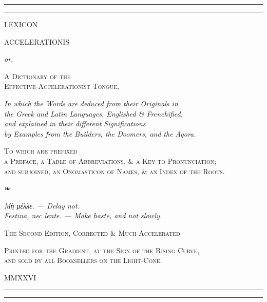 \documentclass[10pt,twoside]{article}
\begin{document}
\pagestyle{empty}

\begin{titlepage}
\centering
\vspace*{4mm}
{\color{rubric}\rule{\textwidth}{1.2pt}}\par\vspace{1.2pt}
\rule{\textwidth}{0.4pt}\par
\vspace{13mm}
{\dispfont\fontsize{38}{40}\selectfont LEXICON\par}
\vspace{2mm}
{\dispfont\fontsize{22}{26}\selectfont\color{rubric} ACCELERATIONIS\par}
\vspace{8mm}
{\large\itshape or,\par}
\vspace{3mm}
{\Large\scshape A Dictionary of the\\[2pt] Effective-Accelerationist Tongue,\par}
\vspace{6mm}
{\normalsize\itshape
In which the Words are deduced from their Originals in\\
the \textup{Greek} and \textup{Latin} Languages, Englished \& Frenchified,\\
and explained in their different Significations\\
by Examples from the Builders, the Doomers, and the Agora.\par}
\vspace{9mm}
{\small\scshape To which are prefixed\\
a Preface, a Table of Abbreviations, \& a Key to Pronunciation;\\
and subjoined, an Onomasticon of Names, \& an Index of the Roots.\par}
\vspace{12mm}
{\color{rubric}\Large ❧\par}
\vspace{10mm}
{\small\itshape
Μὴ μέλλε. — \textup{Delay not.}\\[3pt]
Festina, nec lente. — \textup{Make haste, and not slowly.}\par}
\vfill
{\scshape The Second Edition, Corrected \& Much Accelerated\par}
\vspace{3mm}
{\small\scshape Printed for the Gradient, at the Sign of the Rising Curve,\\
and sold by all Booksellers on the Light-Cone.\par}
\vspace{2mm}
{\liningfont\small MMXXVI\par}
\vspace{6mm}
\rule{\textwidth}{0.4pt}\par\vspace{1.2pt}
{\color{rubric}\rule{\textwidth}{1.2pt}}
\end{titlepage}
\end{document}
